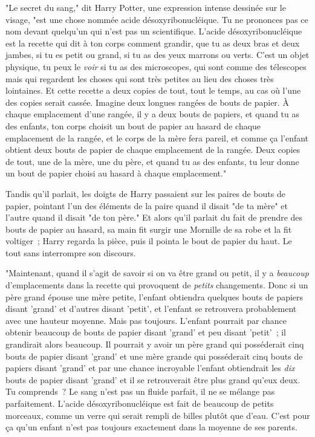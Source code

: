 "Le secret du sang," dit Harry Potter, une expression intense dessinée sur le visage, "est une chose nommée acide désoxyribonucléique. Tu ne prononces pas ce nom devant quelqu'un qui n'est pas un scientifique. L'acide désoxyribonucléique est la recette qui dit à ton corps comment grandir, que tu as deux bras et deux jambes, si tu es petit ou grand, si tu as des yeux marrons ou verts. C'est un objet physique, tu peux le \emph{voir} si tu as des microscopes, qui sont comme des télescopes mais qui regardent les choses qui sont très petites au lieu des choses très lointaines. Et cette recette a deux copies de tout, tout le temps, au cas où l'une des copies serait cassée. Imagine deux longues rangées de bouts de papier. À chaque emplacement d'une rangée, il y a deux bouts de papiers, et quand tu as des enfants, ton corps choisit un bout de papier au hasard de chaque emplacement de la rangée, et le corps de la mère fera pareil, et comme ça l'enfant obtient deux bouts de papier de chaque emplacement de la rangée. Deux copies de tout, une de la mère, une du père, et quand tu as des enfants, tu leur donne un bout de papier choisi au hasard à chaque emplacement."

Tandis qu'il parlait, les doigts de Harry passaient sur les paires de bouts de papier, pointant l'un des éléments de la paire quand il disait "de ta mère" et l'autre quand il disait "de ton père." Et alors qu'il parlait du fait de prendre des bouts de papier au hasard, sa main fit surgir une Mornille de sa robe et la fit voltiger~; Harry regarda la pièce, puis il pointa le bout de papier du haut. Le tout sans interrompre son discours.

"Maintenant, quand il s'agit de savoir si on va être grand ou petit, il y a \emph{beaucoup} d'emplacements dans la recette qui provoquent de \emph{petits} changements. Donc si un père grand épouse une mère petite, l'enfant obtiendra quelques bouts de papiers disant 'grand' et d'autres disant 'petit', et l'enfant se retrouvera probablement avec une hauteur moyenne. Mais pas toujours. L'enfant pourrait par chance obtenir beaucoup de bouts de papier disant 'grand' et peu disant 'petit'~; il grandirait alors beaucoup. Il pourrait y avoir un père grand qui posséderait cinq bouts de papier disant 'grand' et une mère grande qui posséderait cinq bouts de papiers disant 'grand' et par une chance incroyable l'enfant obtiendrait les \emph{dix} bouts de papier disant 'grand' et il se retrouverait être plus grand qu'eux deux. Tu comprends~? Le sang n'est pas un fluide parfait, il ne se mélange pas parfaitement. L'acide désoxyribonucléique est fait de beaucoup de petits morceaux, comme un verre qui serait rempli de billes plutôt que d'eau. C'est pour ça qu'un enfant n'est pas toujours exactement dans la moyenne de ses parents.

